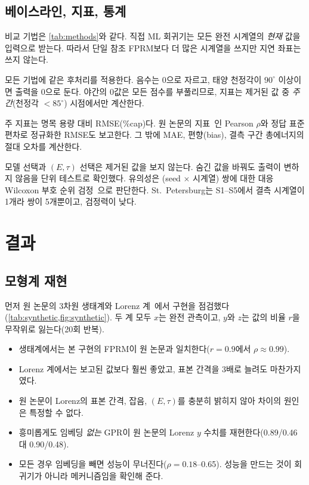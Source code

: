\documentclass[11pt,a4paper]{article}
\newcommand{\tabdir}{../tables/ko}
\begin{document}
\subsection{베이스라인, 지표, 통계}

비교 기법은 \cref{tab:methods}와 같다.
직접 ML 회귀기는 모든 완전 시계열의 \emph{현재} 값을 입력으로 받는다. 따라서 단일 참조 FPRM보다 더 많은 시계열을 쓰지만 지연 좌표는 쓰지 않는다.

모든 기법에 같은 후처리를 적용한다. 음수는 0으로 자르고, 태양 천정각이 $90^\circ$ 이상이면 출력을 0으로 둔다.
야간의 0값은 모든 점수를 부풀리므로, 지표는 제거된 값 중 \emph{주간}(천정각 $<85^\circ$) 시점에서만 계산한다.

주 지표는 명목 용량 대비 RMSE(\%cap)다.
원 논문의 지표~\cite[식 19]{wu2026fprm}인 Pearson $\rho$와 정답 표준편차로 정규화한 RMSE도 보고한다.
그 밖에 MAE, 편향(bias), 결측 구간 총에너지의 절대 오차를 계산한다.

모델 선택과 $(E,\tau)$ 선택은 제거된 값을 보지 않는다. 숨긴 값을 바꿔도 출력이 변하지 않음을 단위 테스트로 확인했다.
유의성은 (seed $\times$ 시계열) 쌍에 대한 대응 Wilcoxon 부호 순위 검정~\cite{wilcoxon1945}으로 판단한다.
St.\ Petersburg는 S1--S5에서 결측 시계열이 1개라 쌍이 5개뿐이고, 검정력이 낮다.

\begin{table}[t]
  \centering\small
  \caption{비교 기법. $^\dagger$: 원 논문에 없는 확장.}
  \label{tab:methods}
  
\end{table}

\section{결과}\label{sec:results}

\subsection{모형계 재현}\label{sec:synthetic}

먼저 원 논문의 3차원 생태계와 Lorenz 계~\cite{lorenz1963}에서 구현을 점검했다(\cref{tab:synthetic,fig:synthetic}).
두 계 모두 $x$는 완전 관측이고, $y$와 $z$는 값의 비율 $r$을 무작위로 잃는다(20회 반복).
\begin{itemize}
  \item 생태계에서는 본 구현의 FPRM이 원 논문과 일치한다($r=0.9$에서 $\rho\approx0.99$).
  \item Lorenz 계에서는 보고된 값보다 훨씬 좋았고, 표본 간격을 3배로 늘려도 마찬가지였다.
  \item 원 논문이 Lorenz의 표본 간격, 잡음, $(E,\tau)$를 충분히 밝히지 않아 차이의 원인은 특정할 수 없다.
  \item 흥미롭게도 임베딩 \emph{없는} GPR이 원 논문의 Lorenz $y$ 수치를 재현한다(0.89/0.46 대 0.90/0.48).
  \item 모든 경우 임베딩을 빼면 성능이 무너진다($\rho=0.18$--0.65). 성능을 만드는 것이 회귀기가 아니라 메커니즘임을 확인해 준다.
\end{itemize}
\end{document}
